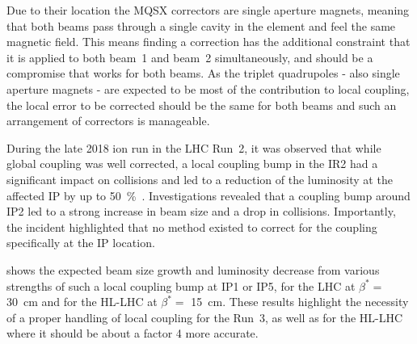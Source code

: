 Due to their location the MQSX correctors are single aperture magnets, meaning that both beams pass through a single cavity in the element and feel the same magnetic field.
This means finding a correction has the additional constraint that it is applied to both beam~\num{1} and beam~\num{2} simultaneously, and should be a compromise that works for both beams.
As the triplet quadrupoles - also single aperture magnets - are expected to be most of the contribution to local coupling, the local error to be corrected should be the same for both beams and such an arrangement of correctors is manageable.

During the late \num{2018} ion run in the LHC Run~\num{2}, it was observed that while global coupling was well corrected, a local coupling bump in the IR\num{2} had a significant impact on collisions and led to a reduction of the luminosity at the affected IP by up to \qty{50}{\percent}~\cite{IPAC:Jowett:LHC_2018_Heavy_Ion_Run, IPAC:Tomas:Run2_Experience_View_LHC_HLLHC, CERN:Persson:LHCOpticsCorrectionsEvian2019}.
Investigations revealed that a coupling bump around IP\num{2} led to a strong increase in beam size and a drop in collisions.
Importantly, the incident highlighted that no method existed to correct for the coupling specifically at the IP location.

 shows the expected beam size growth and luminosity decrease from various strengths of such a local coupling bump at IP\num{1} or IP\num{5}, for the LHC at \(\beta^{*}=\) \qty{30}{\centi\meter} and for the HL-LHC at \(\beta^{*}=\) \qty{15}{\centi\meter}.
These results highlight the necessity of a proper handling of local coupling for the Run~\num{3}, as well as for the HL-LHC where it should be about a factor \num{4} more accurate.

